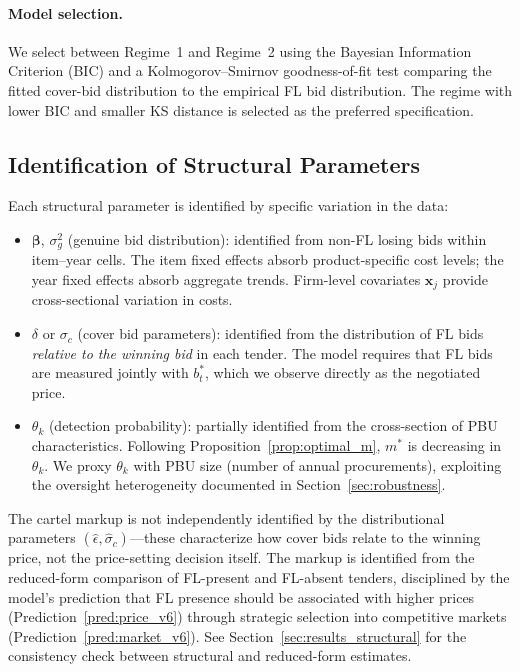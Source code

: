 \paragraph{Model selection.} We select between Regime~1 and Regime~2
using the Bayesian Information Criterion (BIC) and a Kolmogorov--Smirnov
goodness-of-fit test comparing the fitted cover-bid distribution to the
empirical FL bid distribution. The regime with lower BIC and smaller KS
distance is selected as the preferred specification.


\subsection{Identification of Structural Parameters}
\label{sec:identification}

Each structural parameter is identified by specific variation in the
data:

\begin{itemize}
  \item $\boldsymbol{\beta}$, $\sigma_g^2$ (genuine bid distribution):
    identified from non-FL losing bids within item--year cells.
    The item fixed effects absorb product-specific cost levels; the year
    fixed effects absorb aggregate trends. Firm-level covariates
    $\mathbf{x}_j$ provide cross-sectional variation in costs.

  \item $\delta$ or $\sigma_c$ (cover bid parameters): identified from
    the distribution of FL bids \emph{relative to the winning bid} in
    each tender. The model requires that FL bids are measured jointly
    with $b^*_t$, which we observe directly as the negotiated price.

  \item $\theta_k$ (detection probability): partially identified from
    the cross-section of PBU characteristics. Following
    Proposition~\ref{prop:optimal_m}, $m^*$ is decreasing in
    $\theta_k$. We proxy $\theta_k$ with PBU size (number of annual
    procurements), exploiting the oversight heterogeneity
    documented in Section~\ref{sec:robustness}.
\end{itemize}

\noindent The cartel markup is not independently identified by the
distributional parameters $(\hat{\epsilon}, \hat{\sigma}_c)$---these
characterize how cover bids relate to the winning price, not the
price-setting decision itself. The markup is identified from the
reduced-form comparison of FL-present and FL-absent tenders, disciplined
by the model's prediction that FL presence should be associated with
higher prices (Prediction~\ref{pred:price_v6}) through strategic
selection into competitive markets (Prediction~\ref{pred:market_v6}).
See Section~\ref{sec:results_structural} for the consistency check
between structural and reduced-form estimates.

